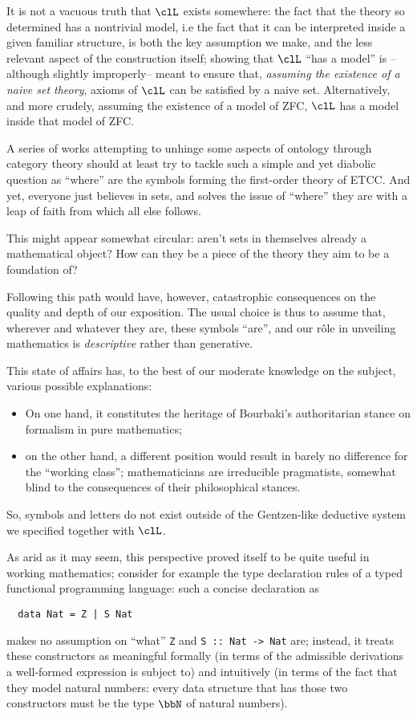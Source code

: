 \documentclass{amsart}
\def\mil#1{\texttt{#1}}
\begin{document}
It is not a vacuous truth that $\clL$ exists somewhere: the fact that the theory so determined has a nontrivial model, i.e the fact that it can be interpreted inside a given familiar structure, is both the key assumption we make, and the less relevant aspect of the construction itself; showing that $\clL$ ``has a model'' is --although slightly improperly-- meant to ensure that, \emph{assuming the existence of a naive set theory}, axioms of $\clL$ can be satisfied by a naive set. Alternatively, and more crudely, assuming the existence of a model of ZFC, $\clL$ has a model inside that model of ZFC.

A series of works attempting to unhinge some aspects of ontology through category theory should at least try to tackle such a simple and yet diabolic question as ``where'' are the symbols forming the first-order theory of ETCC. And yet, everyone just believes in sets, and solves the issue of ``where'' they are with a leap of faith from which all else follows.

This might appear somewhat circular: aren't sets in themselves already a mathematical object? How can they be a piece of the theory they aim to be a foundation of?

Following this path would have, however, catastrophic consequences on the quality and depth of our exposition. The usual choice is thus to assume that, wherever and whatever they are, these symbols ``are'', and our r\^ole in unveiling mathematics is \emph{descriptive} rather than generative.

This state of affairs has, to the best of our moderate knowledge on the subject, various possible explanations:
\begin{itemize}
  \item On one hand, it constitutes the heritage of Bourbaki's authoritarian stance on formalism in pure mathematics;
  \item on the other hand, a different position would result in barely no difference for the ``working class''; mathematicians are irreducible pragmatists, somewhat blind to the consequences of their philosophical stances.
\end{itemize}
So, symbols and letters do not exist outside of the Gentzen-like deductive system we specified together with $\clL$.

As arid as it may seem, this perspective proved itself to be quite useful in working mathematics; consider for example the type declaration rules of a typed functional programming language: such a concise declaration as
\begin{verbatim}
  data Nat = Z | S Nat
\end{verbatim}
makes no assumption on ``what'' \mil{Z} and \mil{S :: Nat -> Nat} are; instead, it treats these constructors as meaningful formally (in terms of the admissible derivations a well-formed expression is subject to) and intuitively (in terms of the fact that they model natural numbers: every data structure that has those two constructors must be the type $\bbN$ of natural numbers).
\end{document}
